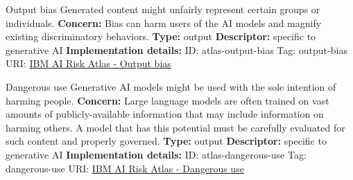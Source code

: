 \begin{definitionbox}{Output bias}
Generated content might unfairly represent certain groups or individuals.\newline\newline
\textbf{Concern: }Bias can harm users of the AI models and magnify existing discriminatory behaviors.\newline\newline
\textbf{Type: }output\newline
\textbf{Descriptor: }specific to generative AI \newline\newline
\textbf{Implementation details: } \newline
ID: atlas-output-bias \newline
Tag: output-bias \newline
URI:  \href{https://www.ibm.com/docs/en/watsonx/saas?topic=SSYOK8/wsj/ai-risk-atlas/output-bias.html}{IBM AI Risk Atlas - Output bias}\newline
\end{definitionbox}
\begin{definitionbox}{Dangerous use}
Generative AI models might be used with the sole intention of harming people.\newline\newline
\textbf{Concern: }Large language models are often trained on vast amounts of publicly-available information that may include information on harming others. A model that has this potential must be carefully evaluated for such content and properly governed.\newline\newline
\textbf{Type: }output\newline
\textbf{Descriptor: }specific to generative AI \newline\newline
\textbf{Implementation details: } \newline
ID: atlas-dangerous-use \newline
Tag: dangerous-use \newline
URI:  \href{https://www.ibm.com/docs/en/watsonx/saas?topic=SSYOK8/wsj/ai-risk-atlas/dangerous-use.html}{IBM AI Risk Atlas - Dangerous use}\newline
\end{definitionbox}
